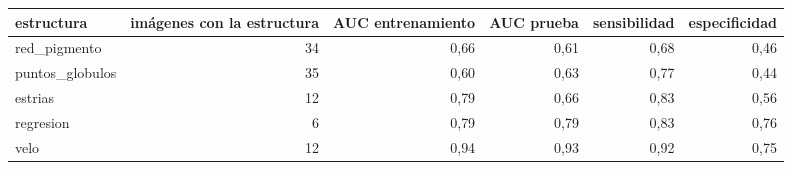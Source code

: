 \begin{tabular}{lrrrrr}
\toprule
estructura & imágenes con la estructura & AUC entrenamiento & AUC prueba & sensibilidad & especificidad \\
\midrule
red_pigmento & 34 & 0{,}66 & 0{,}61 & 0{,}68 & 0{,}46 \\
puntos_globulos & 35 & 0{,}60 & 0{,}63 & 0{,}77 & 0{,}44 \\
estrias & 12 & 0{,}79 & 0{,}66 & 0{,}83 & 0{,}56 \\
regresion & 6 & 0{,}79 & 0{,}79 & 0{,}83 & 0{,}76 \\
velo & 12 & 0{,}94 & 0{,}93 & 0{,}92 & 0{,}75 \\
\bottomrule
\end{tabular}
